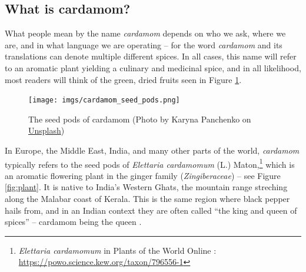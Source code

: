 \documentclass[12pt]{article}
\begin{document}
\subsection{What is cardamom?}

What people mean by the name \textit{cardamom} depends on who we ask, where we are, and in what language we are operating -- for the word \textit{cardamom} and its translations can denote multiple different spices. In all cases, this name will refer to an aromatic plant yielding a culinary and medicinal spice, and in all likelihood, most readers will think of the green, dried fruits seen in Figure \ref{fig:seedpods}.

\begin{figure}[!h]
    \centering
    \texttt{[image: imgs/cardamom\_seed\_pods.png]}
    \caption{The seed pods of cardamom (Photo by Karyna Panchenko on \href{https://unsplash.com/photos/a-pile-of-green-cardamoas-sitting-on-top-of-a-white-table-9_IoYA6EdpY}{Unsplash})}
    \label{fig:seedpods}
\end{figure}



In Europe, the Middle East, India, and many other parts of the world, \textit{cardamom} typically refers to the seed pods of \textit{Elettaria cardamomum} (L.) Maton,\footnote{\textit{Elettaria cardamomum} in Plants of the World Online \parencite{powo}: \url{https://powo.science.kew.org/taxon/796556-1}} which is an aromatic flowering plant in the ginger family (\textit{Zingiberaceae}) -- see Figure \ref{fig:plant}. It is native to India's Western Ghats, the mountain range streching along the Malabar coast of Kerala. This is the same region where black pepper hails from, and in an Indian context they are often called ``the king and queen of spices'' -- cardamom being the queen \parencite{nair_2020_geographya}. 
\end{document}
